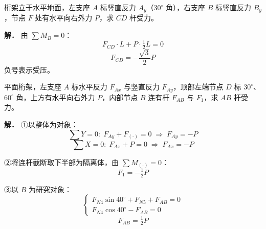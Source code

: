 \begin{example}
桁架立于水平地面，左支座 $A$ 标竖直反力 $A_y$（$30^\circ$ 角），右支座 $B$ 标竖直反力 $B_y$，节点 $F$ 处有水平向右外力 $P$，求 $CD$ 杆受力。

\textbf{解．} 由 $\sum M_B=0$：
\begin{equation}
F_{CD}\cdot L+P\cdot\tfrac12 L=0
\label{eq:2-例-截面-MB}
\end{equation}
\begin{equation}
F_{CD}=-\frac{\sqrt3}{2}P
\label{eq:2-例-截面-FCD}
\end{equation}
负号表示受压。
\end{example}

\begin{example}
平面桁架，左支座 $A$ 标水平反力 $F_{Ax}$ 与竖直反力 $F_{Ay}$，顶部左端节点 $D$ 标 $30^\circ$、$60^\circ$ 角，上方有水平向右外力 $P$，内部节点 $B$ 连有杆 $F_{AB}$ 与 $F_1$，求 $AB$ 杆受力。

\textbf{解．}
①以整体为对象：
\begin{equation}
\sum Y=0:\;F_{Ay}+F_{(\cdot)}=0\;\Rightarrow\;F_{Ay}=-P
\label{eq:2-例-AB-整体Y}
\end{equation}
\begin{equation}
\sum X=0:\;F_{Ax}+P=0\;\Rightarrow\;F_{Ax}=-P
\label{eq:2-例-AB-整体X}
\end{equation}

②将连杆截断取下半部为隔离体，由 $\sum M_{(\cdot)}=0$：
\begin{equation}
F_1=-\tfrac12 P
\label{eq:2-例-AB-F1}
\end{equation}

③以 $B$ 为研究对象：
\begin{equation}
\begin{cases}
F_{N4}\sin40^\circ+F_{N5}+F_{AB}=0\\[2pt]
F_{N4}\cos40^\circ-F_{AB}=0
\end{cases}
\label{eq:2-例-AB-B}
\end{equation}
\begin{equation}
F_{AB}=\tfrac12 P
\label{eq:2-例-AB-结果}
\end{equation}
\end{example}
